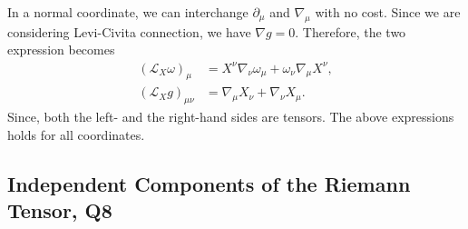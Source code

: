 \begin{solution}
    In a normal coordinate, we can interchange $\partial_\mu$ and $\nabla_\mu$ with no cost. Since we are considering Levi-Civita connection, we have $\nabla g = 0$. Therefore, the two expression becomes
    \begin{align}
        (\mathcal{L}_X\omega)_\mu &= X^\nu\nabla_\nu\omega_\mu + \omega_\nu\nabla_\mu X^\nu,\\
        (\mathcal{L}_X g)_{\mu\nu} &= \nabla_\mu X_\nu + \nabla_\nu X_\mu.
    \end{align}
    Since, both the left- and the right-hand sides are tensors. The above expressions holds for all coordinates.
\end{solution}

\subsection{Independent Components of the Riemann Tensor, Q8}

